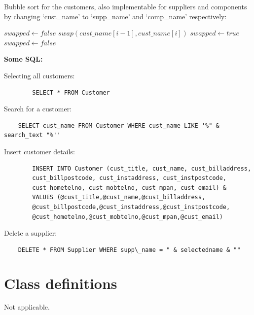 Bubble sort for the customers, also implementable for suppliers and components by changing `cust\_name' to `supp\_name' and `comp\_name' respectively:
\begin{algorithmic}
	\Repeat
		\State $swapped \gets false$
				\State $swap(cust\_name[i - 1], cust\_name[i])$
				\State $swapped \gets true$
			\EndIf
		\EndFor
	\Until $swapped \gets false$ 
\end{algorithmic}

\textbf{Some SQL:}

Selecting all customers:
\begin{verbatim} 
        SELECT * FROM Customer
\end{verbatim}
Search for a customer:
\begin{verbatim}
	SELECT cust_name FROM Customer WHERE cust_name LIKE '%" & search_text "%''
\end{verbatim}
Insert customer details:
\begin{verbatim}
        INSERT INTO Customer (cust_title, cust_name, cust_billaddress,
        cust_billpostcode, cust_instaddress, cust_instpostcode,
        cust_hometelno, cust_mobtelno, cust_mpan, cust_email) &
        VALUES (@cust_title,@cust_name,@cust_billaddress,
        @cust_billpostcode,@cust_instaddress,@cust_instpostcode,
        @cust_hometelno,@cust_mobtelno,@cust_mpan,@cust_email)
\end{verbatim}
Delete a supplier:
\begin{verbatim}
	DELETE * FROM Supplier WHERE supp\_name = " & selectedname & ""
\end{verbatim}
	\section{Class definitions}
Not applicable.
